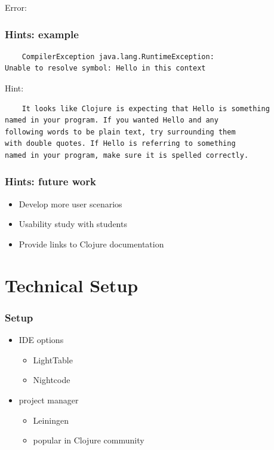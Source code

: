 \documentclass{beamer}
\begin{document}
\begin{frame}[fragile]
Error:
\frametitle{Hints: example}
  	 \begin{verbatim}
	CompilerException java.lang.RuntimeException:
Unable to resolve symbol: Hello in this context
	\end{verbatim}
Hint:
	\begin{verbatim}
	It looks like Clojure is expecting that Hello is something
named in your program. If you wanted Hello and any
following words to be plain text, try surrounding them
with double quotes. If Hello is referring to something
named in your program, make sure it is spelled correctly.
	\end{verbatim}
\end{frame}

\begin{frame}
\frametitle{Hints: future work}
	\begin{itemize}
  	 \item Develop more user scenarios
  	 \item Usability study with students
  	 \item Provide links to Clojure documentation
	 \end{itemize}
\end{frame}
\section{Technical Setup}
\begin{frame}
\frametitle{Setup}
	\begin{itemize}
		\item IDE options
		\begin{itemize}
			\item LightTable
			\item Nightcode
		\end{itemize}
		\item project manager
		\begin{itemize}
			\item Leiningen
			\item popular in Clojure community
		\end{itemize}
	\end{itemize}
\end{frame}

\end{document}
